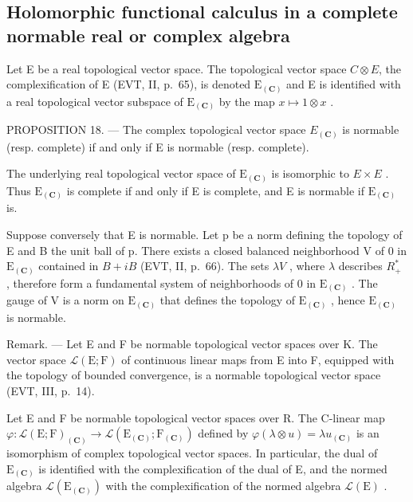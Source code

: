 \subsection{Holomorphic functional calculus in a complete normable real or complex algebra}

Let E be a real topological vector space. The topological vector space \(C \otimes E\), the complexification of E (EVT, II, p.~65), is denoted \(\mathrm{E}_{(\mathbf{C})}\) and E is identified with a real topological vector subspace of \(\mathrm{E}_{(\mathbf{C})}\) by the map \(x \mapsto 1 \otimes x\) .

PROPOSITION 18. --- The complex topological vector space \(E_{(\mathbf{C})}\) is normable (resp. complete) if and only if E is normable (resp. complete).

The underlying real topological vector space of \(\mathrm{E}_{(\mathbf{C})}\) is isomorphic to \(E \times E\) . Thus \(\mathrm{E}_{(\mathbf{C})}\) is complete if and only if E is complete, and E is normable if \(\mathrm{E}_{(\mathbf{C})}\) is.

Suppose conversely that E is normable. Let p be a norm defining the topology of E and B the unit ball of p. There exists a closed balanced neighborhood V of 0 in \(\mathrm{E}_{(\mathbf{C})}\) contained in \(B+iB\) (EVT, II, p.~66). The sets \(\lambda V\) , where \(\lambda\) describes \(R_{+}^{*}\) , therefore form a fundamental system of neighborhoods of 0 in \(\mathrm{E}_{(\mathbf{C})}\) . The gauge of V is a norm on \(\mathrm{E}_{(\mathbf{C})}\) that defines the topology of \(\mathrm{E}_{(\mathbf{C})}\) , hence \(\mathrm{E}_{(\mathbf{C})}\) is normable.

Remark. --- Let E and F be normable topological vector spaces over K. The vector space \(\mathcal{L}(\mathrm{E};\mathrm{F})\) of continuous linear maps from E into F, equipped with the topology of bounded convergence, is a normable topological vector space (EVT, III, p.~14).

Let E and F be normable topological vector spaces over R. The C-linear map \(\varphi\colon\mathcal{L}(\mathrm{E};\mathrm{F})_{(\mathbf{C})}\to\mathcal{L}(\mathrm{E}_{(\mathbf{C})};\mathrm{F}_{(\mathbf{C})})\) defined by \(\varphi(\lambda\otimes u)=\lambda u_{(\mathbf{C})}\) is an isomorphism of complex topological vector spaces. In particular, the dual of \(\mathrm{E}_{(\mathbf{C})}\) is identified with the complexification of the dual of E, and the normed algebra \(\mathcal{L}(\mathrm{E}_{(\mathbf{C})})\) with the complexification of the normed algebra \(\mathcal{L}(\mathrm{E})\) .

